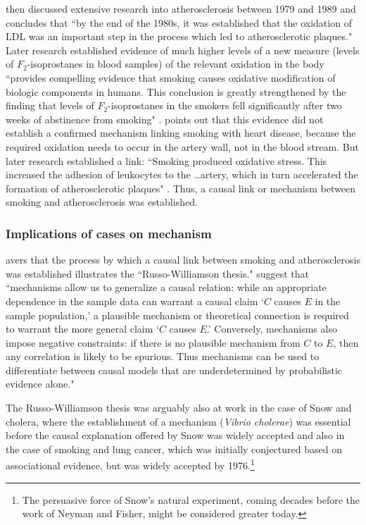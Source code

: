 \documentclass[11pt,reqno]{amsart}
\begin{document}
 \citet{Gillies2011-GILTRT-3} then discussed extensive research into atherosclerosis between 1979 and 1989 and concludes that ``by the end of the 1980s, it was established that the oxidation of LDL was an important step in the process which led to atherosclerotic plaques."  Later research established evidence of much higher levels of a new measure (levels of $F_2$-isoprostanes in blood samples) of the relevant oxidation in the body ``provides compelling evidence that smoking causes oxidative modification of biologic components in humans. This conclusion is greatly strengthened by the finding that levels of $F_2$-isoprostanes in the smokers fell significantly after two weeks of abstinence from smoking" \citep[pp.\,1201--2]{Morrow:1995gz}.  \citet[p.\,120]{Gillies2011-GILTRT-3} points out that this evidence did not establish a confirmed mechanism linking smoking with heart disease, because the required oxidation needs to occur in the artery wall, not in the blood stream. But later research established a link: ``Smoking produced oxidative stress. This increased the adhesion of leukocytes to the \dots artery, which in turn accelerated the formation of atherosclerotic plaques" \citep[p.\,123]{Gillies2011-GILTRT-3}.
Thus, a causal link or mechanism between smoking and atherosclerosis was established.


\subsubsection{Implications of cases on mechanism}
 \citet{Gillies2011-GILTRT-3} avers that the process by which a causal link between smoking and atherosclerosis was established illustrates the ``Russo-Williamson thesis."
 \citet[p.\,159]{Russo:2007iz} suggest that ``mechanisms allow us to generalize a causal relation: while an appropriate dependence in the sample data can warrant a causal claim `$C$ causes $E$ in the sample population,' a plausible mechanism or theoretical connection is required to warrant the more general claim `$C$ causes $E$.' Conversely, mechanisms also impose negative constraints: if there is no plausible mechanism from $C$ to $E$, then any correlation is likely to be spurious. Thus mechanisms can be used to differentiate between causal models that are underdetermined by probabilistic evidence alone."

The Russo-Williamson thesis was arguably also at work in the case of Snow and cholera, where the establishment of a mechanism (\emph{Vibrio cholerae}) was essential before the causal explanation offered by Snow was widely accepted and also in the case of smoking and lung cancer, which was initially conjectured based on associational evidence, but was widely accepted by 1976.\footnote{
The persuasive force of Snow's natural experiment, coming decades before the work of Neyman and Fisher, might be considered greater today.}
\end{document}
